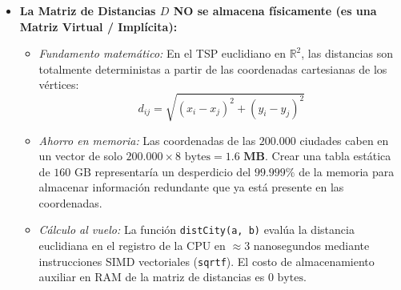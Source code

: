 \documentclass[11pt,a4paper]{article}
\begin{document}
\begin{itemize}
    \item \textbf{La Matriz de Distancias $D$ NO se almacena físicamente (es una Matriz Virtual / Implícita):}
    \begin{itemize}
        \item \emph{Fundamento matemático:} En el TSP euclidiano en $\mathbb{R}^2$, las distancias son totalmente deterministas a partir de las coordenadas cartesianas de los vértices:
        \begin{equation}
            d_{ij} = \sqrt{(x_i - x_j)^2 + (y_i - y_j)^2}
        \end{equation}
        \item \emph{Ahorro en memoria:} Las coordenadas de las $200.000$ ciudades caben en un vector de solo $200.000 \times 8\text{ bytes} = \mathbf{1.6\text{ MB}}$. Crear una tabla estática de $160\text{ GB}$ representaría un desperdicio del $99.999\%$ de la memoria para almacenar información redundante que ya está presente en las coordenadas.
        \item \emph{Cálculo al vuelo:} La función \texttt{distCity(a, b)} evalúa la distancia euclidiana en el registro de la CPU en $\approx 3$ nanosegundos mediante instrucciones SIMD vectoriales (\texttt{sqrtf}). El costo de almacenamiento auxiliar en RAM de la matriz de distancias es \textbf{$0\text{ bytes}$}.
    \end{itemize}


\end{itemize}
\end{document}
